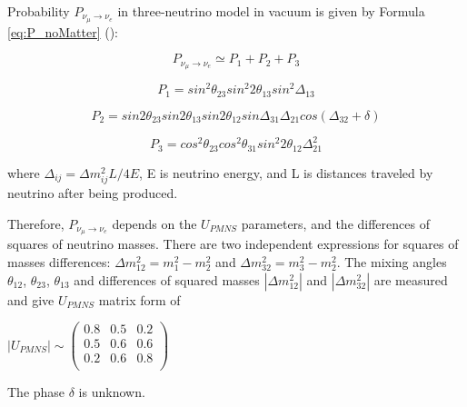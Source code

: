 Probability $P_{\nu_\mu \rightarrow \nu_e}$ in three-neutrino model in vacuum is given by Formula \ref{eq:P_noMatter} (\cite{ref_theory_Osc}): \\
\begin{center}

\begin{equation}
\label{eq:P_noMatter}
P_{\nu_\mu \rightarrow \nu_e} \simeq P_1 + P_2 + P_3 
\end{equation}

\begin{equation}
\label{eq:P_noMatter_1}
P_1 = sin^2{\theta_{23}}sin^2{2\theta_{13}}sin^2{\Delta_{13}}
\end{equation}

\begin{equation}
\label{eq:P_noMatter_2}
P_2 = sin2\theta_{23}sin2\theta_{13}sin2\theta_{12}sin{\Delta_{31}}\Delta_{21}cos(\Delta_{32}+\delta)
\end{equation}

\begin{equation}
\label{eq:P_noMatter_3}
P_3 = cos^2\theta_{23}cos^2\theta_{31}sin^2{2\theta_{12}}\Delta^2_{21}
\end{equation}

where $\Delta_{ij}={\Delta}m^2_{ij}L/4E$, E is neutrino energy, and L is distances traveled by neutrino after being produced.\\
\end{center}

Therefore, $P_{\nu_\mu \rightarrow \nu_e}$ depends on the $U_{PMNS}$ parameters, and the differences of squares of neutrino masses. There are two independent expressions for squares of masses differences: ${\Delta}m_{12}^2 = m_1^2-m_2^2$ and ${\Delta}m_{32}^2 = m_3^2-m_2^2$. The mixing angles $\theta_{12}$, $\theta_{23}$, $\theta_{13}$ and differences of squared masses $|{\Delta}m_{12}^2|$ and $|{\Delta}m_{32}^2|$ are measured and give $U_{PMNS}$ matrix form of\\
\begin{center}
$|U_{PMNS}| \sim
 \begin{pmatrix}
  0.8 & 0.5 & 0.2 \\ 0.5 & 0.6 & 0.6 \\ 0.2 & 0.6 & 0.8 \\
 \end{pmatrix}$\\
\end{center}

The phase $\delta$ is unknown.\\

